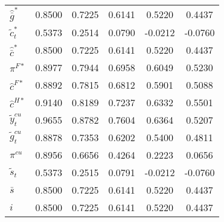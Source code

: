 \begin{center}
\begin{longtable}{lccccc}
${\hat {\bar g}^*}  $	 & 	    0.8500	 & 	    0.7225	 & 	    0.6141	 & 	    0.5220	 & 	    0.4437 \\ 
${\tilde c_t^*}     $	 & 	    0.5373	 & 	    0.2514	 & 	    0.0790	 & 	   -0.0212	 & 	   -0.0760 \\ 
${\hat {\bar c}^*}  $	 & 	    0.8500	 & 	    0.7225	 & 	    0.6141	 & 	    0.5220	 & 	    0.4437 \\ 
${\pi^{F*}}         $	 & 	    0.8977	 & 	    0.7944	 & 	    0.6958	 & 	    0.6049	 & 	    0.5230 \\ 
${\hat c^{F*}}      $	 & 	    0.8892	 & 	    0.7815	 & 	    0.6812	 & 	    0.5901	 & 	    0.5088 \\ 
${\hat c^{H*}}      $	 & 	    0.9140	 & 	    0.8189	 & 	    0.7237	 & 	    0.6332	 & 	    0.5501 \\ 
${\tilde y_t^{cu}}  $	 & 	    0.9655	 & 	    0.8782	 & 	    0.7604	 & 	    0.6364	 & 	    0.5207 \\ 
${\tilde g_t^{cu}}  $	 & 	    0.8878	 & 	    0.7353	 & 	    0.6202	 & 	    0.5400	 & 	    0.4811 \\ 
${\pi^{cu}}         $	 & 	    0.8956	 & 	    0.6656	 & 	    0.4264	 & 	    0.2223	 & 	    0.0656 \\ 
${\tilde s_t}       $	 & 	    0.5373	 & 	    0.2515	 & 	    0.0791	 & 	   -0.0212	 & 	   -0.0760 \\ 
${\bar s}           $	 & 	    0.8500	 & 	    0.7225	 & 	    0.6141	 & 	    0.5220	 & 	    0.4437 \\ 
${i}                $	 & 	    0.8500	 & 	    0.7225	 & 	    0.6141	 & 	    0.5220	 & 	    0.4437 \\ 
\end{longtable}
 \end{center}
